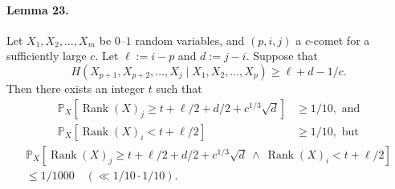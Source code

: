 \documentclass[10pt,a4paper]{article}
\begin{document}
\paragraph{Lemma 23.}
Let $X_1,X_2,\ldots,X_m$ be $0$--$1$ random variables, and $(p,i,j)$ a $c$-comet for a sufficiently large $c$. Let $\ell:=i-p$ and $d:=j-i$.
Suppose that
\[H(X_{p+1},X_{p+2},\ldots,X_j\mid X_1,X_2,\ldots,X_p)\geq\ell+d-1/c.\]
Then there exists an integer $t$ such that
\begin{align*}
\mathbb P_X[\operatorname{Rank}(X)_j\geq t+\ell/2+d/2+c^{1/3}\sqrt d]&\geq1/10,\text{ and}\\
\mathbb P_X[\operatorname{Rank}(X)_i<t+\ell/2]&\geq1/10,\text{ but}
\end{align*}
\begin{multline*}
\mathbb P_X[\operatorname{Rank}(X)_j\geq t+\ell/2+d/2+c^{1/3}\sqrt d\ \wedge\ \operatorname{Rank}(X)_i<t+\ell/2]\\
\leq1/1000\quad(\ll1/10\cdot1/10).
\end{multline*}
\end{document}
